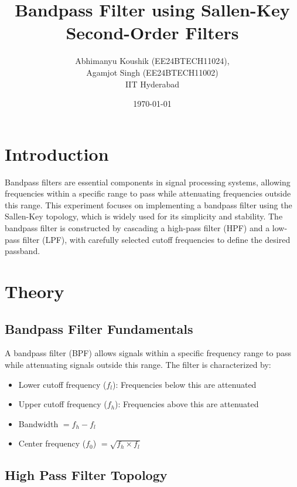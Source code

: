\documentclass[12pt]{article}
\title{Bandpass Filter using Sallen-Key Second-Order Filters}
\author{Abhimanyu Koushik (EE24BTECH11024),\\Agamjot Singh (EE24BTECH11002)\\IIT Hyderabad}
\date{\today}
\begin{document}
\maketitle

\section{Introduction}

Bandpass filters are essential components in signal processing systems, allowing frequencies within a specific range to pass while attenuating frequencies outside this range. This experiment focuses on implementing a bandpass filter using the Sallen-Key topology, which is widely used for its simplicity and stability. The bandpass filter is constructed by cascading a high-pass filter (HPF) and a low-pass filter (LPF), with carefully selected cutoff frequencies to define the desired passband.

\section{Theory}

\subsection{Bandpass Filter Fundamentals}

A bandpass filter (BPF) allows signals within a specific frequency range to pass while attenuating signals outside this range. The filter is characterized by:
\begin{itemize}
    \item Lower cutoff frequency ($f_{l}$): Frequencies below this are attenuated
    \item Upper cutoff frequency ($f_{h}$): Frequencies above this are attenuated
    \item Bandwidth $ = f_{h} - f_{l}$
    \item Center frequency ($f_0$) $ = \sqrt{f_{h} \times f_{l}}$
\end{itemize}

\newpage
\subsection{High Pass Filter Topology}
\end{document}
